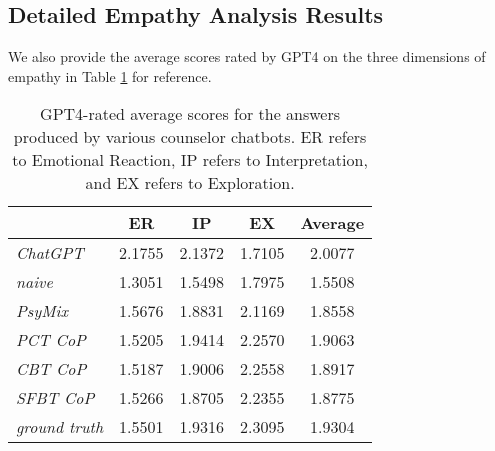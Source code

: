 \subsection{Detailed Empathy Analysis Results}
\label{apd:empathy}

We also provide the average scores rated by GPT4 on the three dimensions of empathy in Table \ref{tab:gpt4score-origin} for reference. 
\begin{table}[htbp]
    \centering
    \small
\begin{tabular}{lcccc}
\toprule
\textbf{}             &ER       &IP     &EX     &Average \\ 
\midrule
\textit{ChatGPT}      &2.1755   &2.1372 &1.7105 &2.0077\\
\textit{naive}        &1.3051   &1.5498 &1.7975 &1.5508\\
\midrule
\textit{PsyMix}  &1.5676   &1.8831 &2.1169 &1.8558\\
\textit{PCT CoP}      &1.5205   &1.9414 &2.2570 &1.9063\\ 
\textit{CBT CoP}      &1.5187   &1.9006 &2.2558 &1.8917\\
\textit{SFBT CoP}     &1.5266   &1.8705 &2.2355 &1.8775\\ 
\midrule
\textit{ground truth} &1.5501   &1.9316 &2.3095 &1.9304\\
\bottomrule
\end{tabular}%

\caption{GPT4-rated average scores for the answers produced by various counselor chatbots. ER refers to Emotional Reaction, IP refers to Interpretation, and EX refers to Exploration.}
\label{tab:gpt4score-origin}
\end{table}



